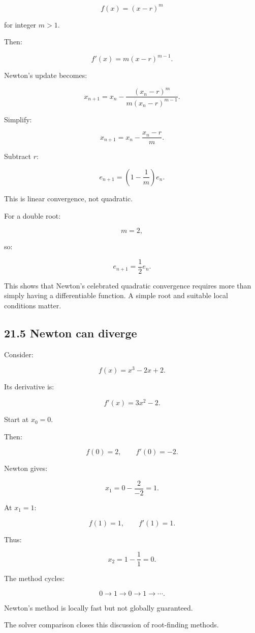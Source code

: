 \[ f(x)=(x-r)^m \]

for integer \(m>1\).

Then:

\[ f'(x)=m(x-r)^{m-1}. \]

Newton's update becomes:

\[ x_{n+1} = x_n- \frac{(x_n-r)^m}{m(x_n-r)^{m-1}}. \]

Simplify:

\[ x_{n+1} = x_n-\frac{x_n-r}{m}. \]

Subtract \(r\):

\[ \boxed{ e_{n+1} = \left(1-\frac1m\right)e_n }. \]

This is linear convergence, not quadratic.

For a double root:

\[ m=2, \]

so:

\[ e_{n+1}=\frac12e_n. \]

This shows that Newton's celebrated quadratic convergence requires more than simply having a differentiable function. A simple root and suitable local conditions matter.

\subsection{21.5 Newton can diverge}\label{02-foundations-ii-ch028-newton-can-diverge}

Consider:

\[ f(x)=x^3-2x+2. \]

Its derivative is:

\[ f'(x)=3x^2-2. \]

Start at \(x_0=0\).

Then:

\[ f(0)=2,\qquad f'(0)=-2. \]

Newton gives:

\[ x_1=0-\frac2{-2}=1. \]

At \(x_1=1\):

\[ f(1)=1,\qquad f'(1)=1. \]

Thus:

\[ x_2=1-\frac11=0. \]

The method cycles:

\[ \boxed{0\rightarrow1\rightarrow0\rightarrow1\rightarrow\cdots}. \]

Newton's method is locally fast but not globally guaranteed.

The solver comparison closes this discussion of root-finding methods.

